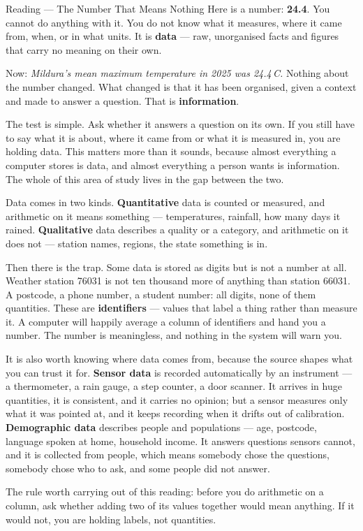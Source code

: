 \documentclass[11pt,a4paper]{article}
\begin{document}
\begin{readingbox}{Reading --- The Number That Means Nothing}
Here is a number: \textbf{24.4}. You cannot do anything with it. You do not know what it measures, where it came from, when, or in what units. It is \textbf{data} --- raw, unorganised facts and figures that carry no meaning on their own.

Now: \textit{Mildura's mean maximum temperature in 2025 was 24.4\,\textdegree C.} Nothing about the number changed. What changed is that it has been organised, given a context and made to answer a question. That is \textbf{information}.

The test is simple. Ask whether it answers a question on its own. If you still have to say what it is about, where it came from or what it is measured in, you are holding data. This matters more than it sounds, because almost everything a computer stores is data, and almost everything a person wants is information. The whole of this area of study lives in the gap between the two.

Data comes in two kinds. \textbf{Quantitative} data is counted or measured, and arithmetic on it means something --- temperatures, rainfall, how many days it rained. \textbf{Qualitative} data describes a quality or a category, and arithmetic on it does not --- station names, regions, the state something is in.

Then there is the trap. Some data is stored as digits but is not a number at all. Weather station 76031 is not ten thousand more of anything than station 66031. A postcode, a phone number, a student number: all digits, none of them quantities. These are \textbf{identifiers} --- values that label a thing rather than measure it. A computer will happily average a column of identifiers and hand you a number. The number is meaningless, and nothing in the system will warn you.

It is also worth knowing where data comes from, because the source shapes what you can trust it for. \textbf{Sensor data} is recorded automatically by an instrument --- a thermometer, a rain gauge, a step counter, a door scanner. It arrives in huge quantities, it is consistent, and it carries no opinion; but a sensor measures only what it was pointed at, and it keeps recording when it drifts out of calibration. \textbf{Demographic data} describes people and populations --- age, postcode, language spoken at home, household income. It answers questions sensors cannot, and it is collected from people, which means somebody chose the questions, somebody chose who to ask, and some people did not answer.

The rule worth carrying out of this reading: before you do arithmetic on a column, ask whether adding two of its values together would mean anything. If it would not, you are holding labels, not quantities.
\end{readingbox}
\end{document}
